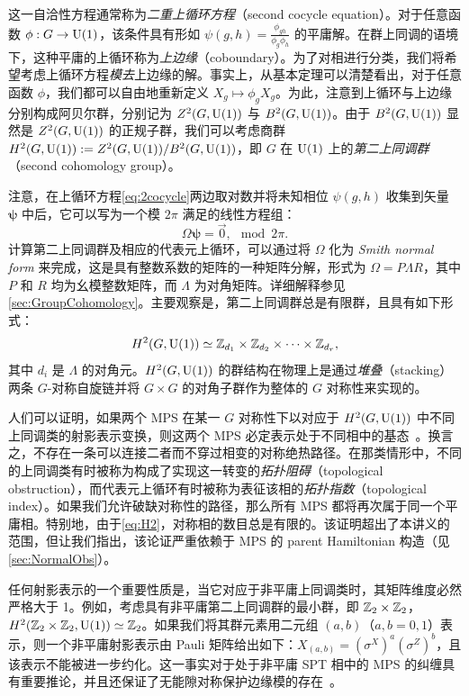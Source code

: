 这一自洽性方程通常称为\emph{二重上循环方程}（second cocycle equation）。对于任意函数 $\phi:G\rightarrow{\rm U}(1)$，该条件具有形如 $\psi(g,h)=\frac{\phi_{gh}}{\phi_g \phi_h}$ 的平庸解。在群上同调的语境下，这种平庸的上循环称为\emph{上边缘}（coboundary）。为了对相进行分类，我们将希望考虑上循环方程\emph{模去}上边缘的解。事实上，从基本定理可以清楚看出，对于任意函数 $\phi$，我们都可以自由地重新定义 $X_g\mapsto \phi_gX_g$。为此，注意到上循环与上边缘分别构成阿贝尔群，分别记为 $Z^2(G,{\rm U}(1))$ 与 $B^2(G,{\rm U}(1))$。由于 $B^2(G,{\rm U}(1))$ 显然是 $Z^2(G,{\rm U}(1))$ 的正规子群，我们可以考虑商群 $H^2(G,{\rm U}(1)):=Z^2(G,{\rm U}(1))/B^2(G,{\rm U}(1))$，即 $G$ 在 ${\rm U}(1)$ 上的\emph{第二上同调群}（second cohomology group）。

注意，在上循环方程\cref{eq:2cocycle}两边取对数并将未知相位 $\psi(g,h)$ 收集到矢量 $\bm{\psi}$ 中后，它可以写为一个模 $2\pi$ 满足的线性方程组：
\begin{equation}
    \Omega \bm{\psi} = \vec{0}, \mod 2\pi.
\end{equation}
计算第二上同调群及相应的代表元上循环，可以通过将 $\Omega$ 化为 \emph{Smith normal form} 来完成，这是具有整数系数的矩阵的一种矩阵分解，形式为 $\Omega=P\Lambda R$，其中 $P$ 和 $R$ 均为幺模整数矩阵，而 $\Lambda$ 为对角矩阵。详细解释参见\cref{sec:GroupCohomology}。主要观察是，第二上同调群总是有限群，且具有如下形式：
\begin{equation}\label{eq:H2}
    H^2(G,{\rm U}(1)) \simeq \mathbb Z_{d_1}\times\mathbb Z_{d_2}\times\dots\times\mathbb Z_{d_r},
\end{equation}
其中 $d_i$ 是 $\Lambda$ 的对角元。$H^2(G,{\rm U}(1))$ 的群结构在物理上是通过\emph{堆叠}（stacking）两条 $G$-对称自旋链并将 $G\times G$ 的对角子群作为整体的 $G$ 对称性来实现的。

人们可以证明，如果两个 MPS 在某一 $G$ 对称性下以对应于 $H^2(G,{\rm U}(1))$ 中不同上同调类的射影表示变换，则这两个 MPS 必定表示处于不同相中的基态~\cite{Schuch2011}。换言之，不存在一条可以连接二者而不穿过相变的对称绝热路径。在那类情形中，不同的上同调类有时被称为构成了实现这一转变的\emph{拓扑阻碍}（topological obstruction），而代表元上循环有时被称为表征该相的\emph{拓扑指数}（topological index）。如果我们允许破缺对称性的路径，那么所有 MPS 都将再次属于同一个平庸相。特别地，由于\cref{eq:H2}，对称相的数目总是有限的。该证明超出了本讲义的范围，但让我们指出，该论证严重依赖于 MPS 的 parent Hamiltonian 构造（见\cref{sec:NormalObs}）。

\bigskip\noindent 任何射影表示的一个重要性质是，当它对应于非平庸上同调类时，其矩阵维度必然严格大于 1。例如，考虑具有非平庸第二上同调群的最小群，即 $\mathbb Z_2\times \mathbb Z_2$，$H^2(\mathbb Z_2\times \mathbb Z_2,{\rm U}(1))\simeq \mathbb Z_2$。如果我们将其群元素用二元组 $(a,b)$（$a,b=0,1$）表示，则一个非平庸射影表示由 Pauli 矩阵给出如下：$X_{(a,b)}=(\sigma^X)^a(\sigma^Z)^b$，且该表示不能被进一步约化。这一事实对于处于非平庸 SPT 相中的 MPS 的纠缠具有重要推论，并且还保证了无能隙对称保护边缘模的存在~\cite{Pollmann2009}。

